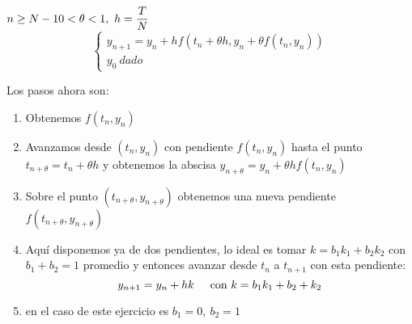 \documentclass[openany]{book}
\begin{document}
    \begin{exercise}
        $ n\geq N-1\\ 0 < \theta < 1,\ h=\dfrac{T}{N} $
        $$ \left\{
        \begin{array}{l}
            y_{n+1} = y_n+h f(t_n+ \theta h, y_n+ \theta f(t_n,y_n) )\\
            y_0\ dado
        \end{array}
        \right. $$

        Los pasos ahora son:
        \begin{enumerate}
            \item Obtenemos $ f(t_n,y_n) $
            \item Avanzamos desde $ (t_n,y_n) $ con pendiente $ f(t_n,y_n) $ hasta el punto $ t_{n+\theta} = t_n+ \theta h $ y obtenemos la abscisa $ y_{n+\theta} = y_n+\theta hf(t_n,y_n) $
            \item Sobre el punto $ (t_{n+\theta},y_{n+\theta}) $ obtenemos una nueva pendiente $ f(t_{n+\theta},y_{n+\theta}) $
            \item Aquí disponemos ya de dos pendientes, lo ideal es tomar $ k = b_1k_1+b_2k_2  $ con $ b_1+b_2 = 1 $ promedio y entonces avanzar desde $ t_n $ a $ t_{n+1} $ con esta pendiente:
                $$ y_{n+1} = y_n + hk \hspace{5mm} \text{con } k = b_1k_1+b_2+k_2 $$
            \item en el caso de este ejercicio es $ b_1 = 0,\ b_2 = 1 $ 


        \end{enumerate}
    
    \end{exercise}


    \setcounter{ex}{15}
\end{document}

